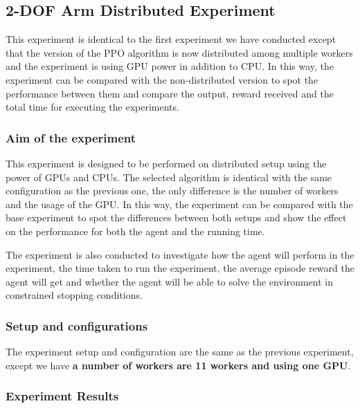 
\subsection{2-DOF Arm Distributed Experiment}

This experiment is identical to the first experiment we have conducted except that the version of the PPO algorithm is now distributed among multiple workers and the experiment is using GPU power in addition to CPU. In this way, the experiment can be compared with the non-distributed version to spot the performance between them and compare the output, reward received and the total time for executing the experiments. 

\subsubsection{Aim of the experiment}

This experiment is designed to be performed on distributed setup using the power of GPUs and CPUs. The selected algorithm is identical with the same configuration as the previous one, the only difference is the number of workers and the usage of the GPU. In this way, the experiment can be compared with the base experiment to spot the differences between both setups and show the effect on the performance for both the agent and the running time.

The experiment is also conducted to investigate how the agent will perform in the experiment, the time taken to run the experiment, the average episode reward the agent will get and whether the agent will be able to solve the environment in constrained stopping conditions.

\subsubsection{Setup and configurations}

The experiment setup and configuration are the same as the previous experiment, except we have \textbf{a number of workers are 11 workers and using one GPU}.

\subsubsection{Experiment Results}

